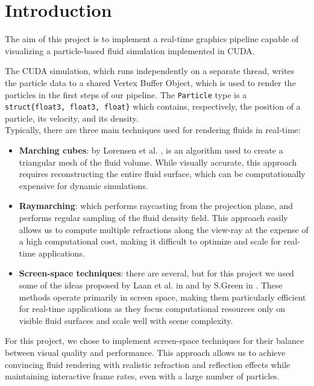 
\section{Introduction} %

The aim of this project is to implement a real-time graphics pipeline capable of visualizing a particle-based fluid simulation implemented in CUDA.

\noindent
The CUDA simulation, which runs independently on a separate thread, writes the particle data to a shared Vertex Buffer Object, which is used to render the particles in the first steps of our pipeline. The \texttt{Particle} type is a \texttt{struct\{float3, float3, float\}} which contains, respectively, the position of a particle, its velocity, and its density.\\

\noindent
Typically, there are three main techniques used for rendering fluids in real-time:
\begin{itemize}
    \item \textbf{Marching cubes}: by Lorensen et al. \cite{marchingCubes1988}, is an algorithm used to create a triangular mesh of the fluid volume. While visually accurate, this approach requires reconstructing the entire fluid surface, which can be computationally expensive for dynamic simulations.
    \item \textbf{Raymarching}: which performs raycasting from the projection plane, and performs regular sampling of the fluid density field. This approach easily allows us to compute multiple refractions along the view-ray at the expense of a high computational cost, making it difficult to optimize and scale for real-time applications.
    \item \textbf{Screen-space techniques}: there are several, but for this project we used some of the ideas proposed by Laan et al. in \cite{green2009screen} and by S.Green in \cite{green2010GDC}. These methods operate primarily in screen space, making them particularly efficient for real-time applications as they focus computational resources only on visible fluid surfaces and scale well with scene complexity.
\end{itemize}

\noindent
For this project, we chose to implement screen-space techniques for their balance between visual quality and performance. This approach allows us to achieve convincing fluid rendering with realistic refraction and reflection effects while maintaining interactive frame rates, even with a large number of particles.

